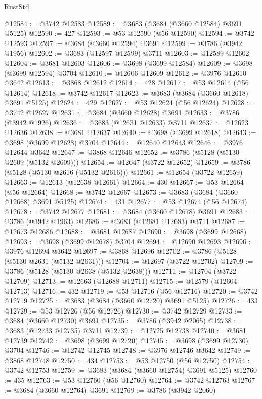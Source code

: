 \begin{lexlean}{RustStd}
\begin{coremodule}
@12584 := @3742 @12583
@12589 := @3683 (@3684 (@3660 @12584) @3691 @5125)
@12590 := 427
@12593 := @53 @12590 (@56 @12590)
@12594 := @3742 @12593
@12597 := @3684 (@3660 @12594) @3691
@12599 := @3786 (@3942 @1956)
@12602 := @3683 (@12597 @12599) @3711
@12603 := @12589 @12602
@12604 := @3681 @12603
@12606 := @3698 (@3699 @12584)
@12609 := @3698 (@3699 @12594) @3704
@12610 := @12606 @12609
@12612 := @3976 @12610 @3642
@12613 := @3868 @12612
@12614 := 428
@12617 := @53 @12614 (@56 @12614)
@12618 := @3742 @12617
@12623 := @3683 (@3684 (@3660 @12618) @3691 @5125)
@12624 := 429
@12627 := @53 @12624 (@56 @12624)
@12628 := @3742 @12627
@12631 := @3684 (@3660 @12628) @3691
@12633 := @3786 (@3942 @1926)
@12636 := @3683 (@12631 @12633) @3711
@12637 := @12623 @12636
@12638 := @3681 @12637
@12640 := @3698 (@3699 @12618)
@12643 := @3698 (@3699 @12628) @3704
@12644 := @12640 @12643
@12646 := @3976 @12644 @3642
@12647 := @3868 @12646
@12652 := @3786 (@5128 (@5130 @2609 (@5132 @2609)))
@12654 := @12647 (@3722 @12652)
@12659 := @3786 (@5128 (@5130 @2616 (@5132 @2616)))
@12661 := @12654 (@3722 @12659)
@12663 := @12613 (@12638 @12661)
@12664 := 430
@12667 := @53 @12664 (@56 @12664)
@12668 := @3742 @12667
@12673 := @3683 (@3684 (@3660 @12668) @3691 @5125)
@12674 := 431
@12677 := @53 @12674 (@56 @12674)
@12678 := @3742 @12677
@12681 := @3684 (@3660 @12678) @3691
@12683 := @3786 (@3942 @1963)
@12686 := @3683 (@12681 @12683) @3711
@12687 := @12673 @12686
@12688 := @3681 @12687
@12690 := @3698 (@3699 @12668)
@12693 := @3698 (@3699 @12678) @3704
@12694 := @12690 @12693
@12696 := @3976 @12694 @3642
@12697 := @3868 @12696
@12702 := @3786 (@5128 (@5130 @2631 (@5132 @2631)))
@12704 := @12697 (@3722 @12702)
@12709 := @3786 (@5128 (@5130 @2638 (@5132 @2638)))
@12711 := @12704 (@3722 @12709)
@12713 := @12663 (@12688 @12711)
@12715 := @12579 (@12604 @12713)
@12716 := 432
@12719 := @53 @12716 (@56 @12716)
@12720 := @3742 @12719
@12725 := @3683 (@3684 (@3660 @12720) @3691 @5125)
@12726 := 433
@12729 := @53 @12726 (@56 @12726)
@12730 := @3742 @12729
@12733 := @3684 (@3660 @12730) @3691
@12735 := @3786 (@3942 @2065)
@12738 := @3683 (@12733 @12735) @3711
@12739 := @12725 @12738
@12740 := @3681 @12739
@12742 := @3698 (@3699 @12720)
@12745 := @3698 (@3699 @12730) @3704
@12746 := @12742 @12745
@12748 := @3976 @12746 @3642
@12749 := @3868 @12748
@12750 := 434
@12753 := @53 @12750 (@56 @12750)
@12754 := @3742 @12753
@12759 := @3683 (@3684 (@3660 @12754) @3691 @5125)
@12760 := 435
@12763 := @53 @12760 (@56 @12760)
@12764 := @3742 @12763
@12767 := @3684 (@3660 @12764) @3691
@12769 := @3786 (@3942 @2060)

\end{coremodule}
\end{lexlean}

